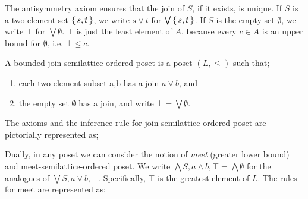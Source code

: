 The antisymmetry axiom ensures that the join of $S$, if it exists, is unique. 
If $S$ is a two-element set $\set{s,t}$, we write $s \vee t$ for $\bigvee\set{s,t}$. 
If $S$ is the empty set $\emptyset$, we write $\bot$ for $\bigvee\emptyset$. 
$\bot$ is just the least element of $A$,
because every $c \in A$ is an upper bound for $\emptyset$, i.e. $\bot \leq c$. 

\begin{definition}
A bounded join-semilattice-ordered poset is a poset $(L,\leq)$ such that;
\begin{enumerate}
\item  each two-element subset {a,b} has a join $a \vee b$, and
\item  the empty set $\emptyset$  has a join, and write $\bot = \bigvee\emptyset$.
\end{enumerate}
\end{definition}

The axioms and the inference rule for join-semilattice-ordered poset are pictorially represented as;
\begin{center}
\end{center}

Dually, in any poset we can consider the notion of {\em meet} (greater lower bound)
and meet-semilattice-ordered poset. 
We write $\bigwedge S, a \wedge b, \top = \bigwedge\emptyset$ 
for the analogues of $\bigvee S, a \vee b, \bot$. 
Specifically, $\top$ is the greatest element of $L$. 
The rules for meet are represented as;
\begin{center}
\end{center}

